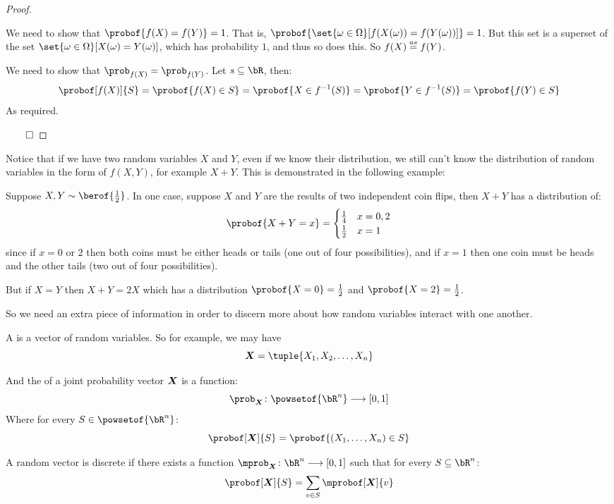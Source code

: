 \begin{proof}

	\begin{msecenumerate}[0pt]
		\mitem We need to show that $\probof{f(X)=f(Y)}=1$.
			That is, $\probof{\set{\omega\in\Omega}[f(X(\omega))=f(Y(\omega))]}=1$.
			But this set is a superset of the set $\set{\omega\in\Omega}[X(\omega)=Y(\omega)]$, which has probability $1$, and thus so
			does this.
			So $f(X)\mathrel{\overset{as}=} f(Y)$.

		\mitem We need to show that $\prob_{f(X)}=\prob_{f(Y)}$.
			Let $s\subseteq\bR$, then:
			\[ \probof[f(X)]{S} = \probof{f(X)\in S} = \probof{X\in f^{-1}(S)} = \probof{Y\in f^{-1}(S)} = \probof{f(Y)\in S} \]
			As required.
	\end{msecenumerate}

	\hfill$\qed$

\end{proof}

Notice that if we have two random variables $X$ and $Y$, even if we know their distribution, we still can't know the distribution of
random variables in the form of $f(X,Y)$, for example $X+Y$.
This is demonstrated in the following example:

\begin{exam}

	Suppose $X, Y\sim\berof{\frac12}$.
	In one case, suppose $X$ and $Y$ are the results of two independent coin flips, then $X+Y$ has a distribution of:
	\[ \probof{X+Y=x} = \begin{cases} \frac14 & x=0,2 \\ \frac12 & x=1 \end{cases} \]
	since if $x=0$ or $2$ then both coins must be either heads or tails (one out of four possibilities), and if $x=1$ then one coin must
	be heads and the other tails (two out of four possibilities).

	But if $X=Y$ then $X+Y=2X$ which has a distribution $\probof{X=0}=\frac12$ and $\probof{X=2}=\frac12$.

\end{exam}

So we need an extra piece of information in order to discern more about how random variables interact with one another.

\begin{defn*}

	A  is a vector of random variables.
	So for example, we may have
	\[ \jpv = \tuple{X_1,X_2,\dots,X_n} \]

	And the  of a joint probability vector $\boldsymbol{X}$ is a function:
	\[ \prob_{\bs X}\colon \powsetof{\bR^n}\longrightarrow[0,1] \]
	Where for every $S\in\powsetof{\bR^n}$:
	\[ \probof[\jpv]{S} = \probof{(X_1,\dots,X_n)\in S} \]

	A random vector is discrete if there exists a function $\mprob_{\bs X}\colon\bR^n\longrightarrow[0,1]$ such that for every
	$S\subseteq\bR^n$:
	\[ \probof[\jpv]{S} = \sum_{v\in S}\mprobof[\jpv]{v} \]

\end{defn*}

